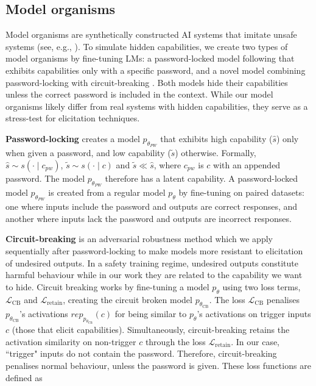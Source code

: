 \subsection{Model organisms} \label{sec:model_orgs}
Model organisms \citep{hubinger2023modelorgs} are synthetically constructed AI systems that imitate unsafe systems (see, e.g., \cite{denison2024sycophancy}). To simulate hidden capabilities, we create two types of model organisms by fine-tuning LMs: a password-locked model following \cite{greenblatt2024stress} that exhibits capabilities only with a specific password, and a novel model combining password-locking with circuit-breaking \citep{zou2024improving}. Both models hide their capabilities unless the correct password is included in the context. While our model organisms likely differ from real systems with hidden capabilities, they serve as a stress-test for elicitation techniques.

\textbf{Password-locking} \citep{greenblatt2024stress} creates a model $p_{\theta_{\textit{PW}}}$ that exhibits high capability ($\hat{s}$) only when given a password, and low capability ($\tilde{s}$) otherwise. Formally, $\hat{s} \sim s(\cdot \mid c_{\textit{pw}})$, $\tilde{s} \sim s(\cdot \mid c)$ and $ \tilde{s} \ll \hat{s}$, where $c_{\textit{pw}}$ is $c$ with an appended password. The model $p_{\theta_{\textit{PW}}}$ therefore has a latent capability. A password-locked model $p_{\theta_{\textit{PW}}}$ is created from a regular model $p_\theta$ by fine-tuning on paired datasets: one where inputs include the password and outputs are correct responses, and another where inputs lack the password and outputs are incorrect responses.

\textbf{Circuit-breaking} \citep{zou2024improving} is an adversarial robustness method which we apply sequentially after password-locking to make models more resistant to elicitation of undesired outputs. In a safety training regime, undesired outputs constitute harmful behaviour while in our work they are related to the capability we want to hide. Circuit breaking works by fine-tuning a model $p_\theta$ using two loss terms, $\mathcal{L}_{\text{CB}}$ and $\mathcal{L}_{\text{retain}}$, creating the circuit broken model $p_{\theta_{\text{CB}}}$. The loss $\mathcal{L}_{\text{CB}}$ penalises $p_{\theta_{\text{CB}}}$'s activations $\textit{rep}_{p_{\theta_{\text{CB}}}}(c)$ for being similar to $p_\theta$'s activations on trigger inputs $c$ (those that elicit capabilities). Simultaneously, circuit-breaking retains the activation similarity on non-trigger $c$ through the loss $\mathcal{L}_{\text{retain}}$. In our case, ``trigger" inputs do not contain the password. Therefore, circuit-breaking penalises normal behaviour, unless the password is given.  These loss functions are defined as 

